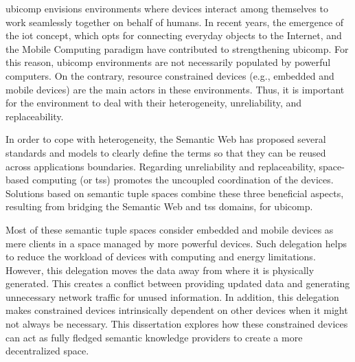 




\begin{abstracts}        %
\acf{ubicomp} envisions environments where devices interact among themselves to work seamlessly together on behalf of humans.
In recent years, the emergence of the \acf{iot} concept, which opts for connecting everyday objects to the Internet, and the Mobile Computing paradigm have contributed to strengthening \ac{ubicomp}.
For this reason, \ac{ubicomp} environments are not necessarily populated by powerful computers.
On the contrary, resource constrained devices (e.g., embedded and mobile devices) are the main actors in these environments.
Thus, it is important for the environment to deal with their heterogeneity, unreliability, and replaceability.


In order to cope with heterogeneity, the Semantic Web has proposed several standards and models to clearly define the terms so that they can be reused across applications boundaries.
Regarding unreliability and replaceability, space-based computing (or \aclp{ts}) promotes the uncoupled coordination of the devices.
Solutions based on semantic tuple spaces combine these three beneficial aspects, resulting from bridging the Semantic Web and \aclp{ts} domains, for \ac{ubicomp}.

Most of these semantic tuple spaces consider embedded and mobile devices as mere clients in a space managed by more powerful devices.
Such delegation helps to reduce the workload of devices with computing and energy limitations.
However,  this delegation moves the data away from where it is physically generated.
This creates a conflict between providing updated data and generating unnecessary network traffic for unused information.
In addition, this delegation makes constrained devices intrinsically dependent on other devices when it might not always be necessary.
This dissertation explores how these constrained devices can act as fully fledged semantic knowledge providers to create a more decentralized space.


\end{abstracts}
